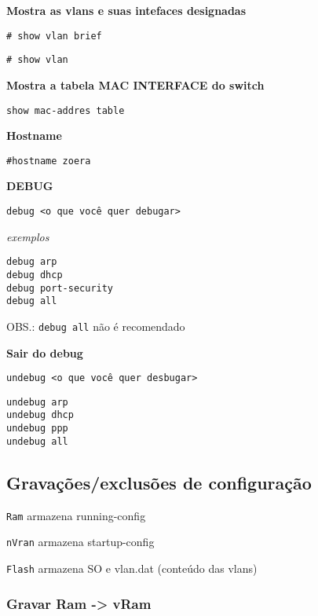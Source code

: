\documentclass[]{article}
\begin{document}
\textbf{Mostra as vlans e suas intefaces designadas}

\begin{verbatim}
# show vlan brief
\end{verbatim}

\begin{verbatim}
# show vlan
\end{verbatim}

\textbf{Mostra a tabela MAC \textbar{} INTERFACE do switch}

\begin{verbatim}
show mac-addres table
\end{verbatim}

\textbf{Hostname}

\begin{verbatim}
#hostname zoera
\end{verbatim}

\textbf{DEBUG}

\begin{verbatim}
debug <o que você quer debugar>
\end{verbatim}

\emph{exemplos}

\begin{verbatim}
debug arp
debug dhcp
debug port-security
debug all
\end{verbatim}

OBS.: \texttt{debug\ all} não é recomendado

\textbf{Sair do debug}

\begin{verbatim}
undebug <o que você quer desbugar>
\end{verbatim}

\begin{verbatim}
undebug arp
undebug dhcp
undebug ppp
undebug all
\end{verbatim}

\subsection{Gravações/exclusões de
configuração}\label{gravauxe7uxf5esexclusuxf5es-de-configurauxe7uxe3o}

\texttt{Ram} armazena running-config

\texttt{nVran} armazena startup-config

\texttt{Flash} armazena SO e vlan.dat (conteúdo das vlans)

\subsubsection{Gravar Ram -\textgreater{} vRam}\label{gravar-ram---vram}
\end{document}

